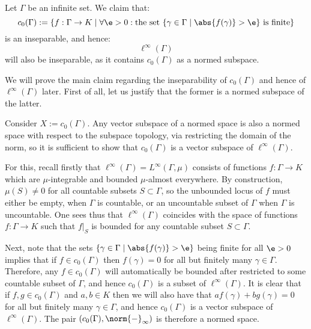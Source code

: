         \begin{example} \label{example: ell_infinity_spaces_of_infinite_dimensions_is_inseparable}
            Let $\Gamma$ be an infinite set. We claim that:
                $$c_0(\Gamma) := \{ f: \Gamma \to K \mid \forall \e > 0: \text{the set $\{ \gamma \in \Gamma \mid \abs{f(\gamma)} > \e \}$ is finite} \}$$
            is an inseparable, and hence:
                $$\ell^{\infty}(\Gamma)$$
            will also be inseparable, as it contains $c_0(\Gamma)$ as a normed subspace.

            We will prove the main claim regarding the inseparability of $c_0(\Gamma)$ and hence of $\ell^{\infty}(\Gamma)$ later. First of all, let us justify that the former is a normed subspace of the latter. 
        
            Consider $X := c_0(\Gamma)$. Any vector subspace of a normed space is also a normed space with respect to the subspace topology, via restricting the domain of the norm, so it is sufficient to show that $c_0(\Gamma)$ is a vector subspace of $\ell^{\infty}(\Gamma)$.
                    
            For this, recall firstly that $\ell^{\infty}(\Gamma) = L^{\infty}(\Gamma, \mu)$ consists of functions $f: \Gamma \to K$ which are $\mu$-integrable and bounded $\mu$-almost everywhere. By construction, $\mu(S) \not = 0$ for all countable subsets $S \subset \Gamma$, so the unbounded locus of $f$ must either be empty, when $\Gamma$ is countable, or an uncountable subset of $\Gamma$ when $\Gamma$ is uncountable. One sees thus that $\ell^{\infty}(\Gamma)$ coincides with the space of functions $f: \Gamma \to K$ such that $f|_S$ is bounded for any countable subset $S \subset \Gamma$.
            
            Next, note that the sets $\{ \gamma \in \Gamma \mid \abs{f(\gamma)} > \e \}$ being finite for all $\e > 0$ implies that if $f \in c_0(\Gamma)$ then $f(\gamma) = 0$ for all but finitely many $\gamma \in \Gamma$. Therefore, any $f \in c_0(\Gamma)$ will automatically be bounded after restricted to some countable subset of $\Gamma$, and hence $c_0(\Gamma)$ is a subset of $\ell^{\infty}(\Gamma)$. It is clear that if $f, g \in c_0(\Gamma)$ and $a, b \in K$ then we will also have that $af(\gamma) + bg(\gamma) = 0$ for all but finitely many $\gamma \in \Gamma$, and hence $c_0(\Gamma)$ is a vector subspace of $\ell^{\infty}(\Gamma)$. The pair $( c_0(\Gamma), \norm{-}_{\infty} )$ is therefore a normed space.
        \end{example}
